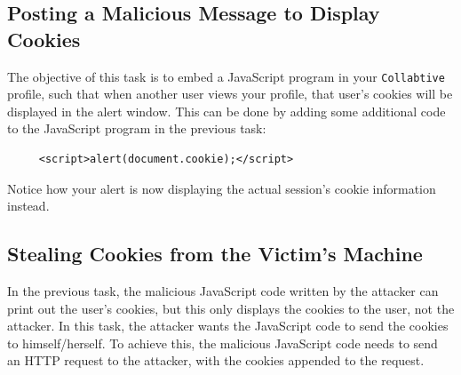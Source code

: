 \documentclass{article}
\begin{document}
\subsection{Posting a Malicious Message to Display Cookies}
The objective of this task is to embed a JavaScript program in your 
{\tt Collabtive} profile, such that when another user views your profile,
that user's cookies will be displayed in the alert window.
This can be done by adding some additional code to
the JavaScript program in the previous task:

\begin{Verbatim}
     <script>alert(document.cookie);</script> 
\end{Verbatim}

Notice how your alert is now displaying the actual session's cookie information instead.\\



\subsection{Stealing Cookies from the Victim's Machine}

In the previous task, the malicious JavaScript code written by 
the attacker can print out the
user's cookies, but this only displays the cookies to the user, not the 
attacker.  In this task, the attacker wants the JavaScript code 
to send the cookies to himself/herself.
To achieve this, the malicious JavaScript code needs to 
send an HTTP request to the attacker, with the cookies appended to 
the request. 
\end{document}
